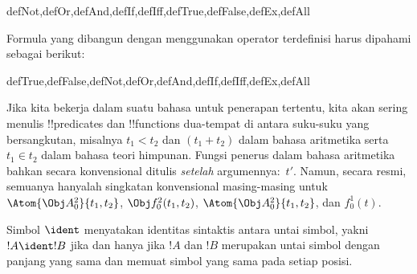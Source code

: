 \documentclass[../../../include/open-logic-section]{subfiles}
\begin{document}
\begin{tagblock}{defNot,defOr,defAnd,defIf,defIff,defTrue,defFalse,defEx,defAll}
\begin{defn}
Formula yang dibangun dengan menggunakan operator terdefinisi harus dipahami
sebagai berikut:

\begin{tagenumerate}{defTrue,defFalse,defNot,defOr,defAnd,defIf,defIff,defEx,defAll}









\end{tagenumerate}
\end{defn}
\end{tagblock}

Jika kita bekerja dalam suatu bahasa untuk penerapan tertentu, kita akan
sering menulis !!{predicate}s dan !!{function}s dua-tempat di antara
suku-suku yang bersangkutan, misalnya $t_1 < t_2$ dan $(t_1 + t_2)$ dalam
bahasa aritmetika serta $t_1 \in t_2$ dalam bahasa teori himpunan. Fungsi
penerus dalam bahasa aritmetika bahkan secara konvensional ditulis
\emph{setelah} argumennya:~$t'$. Namun, secara resmi, semuanya hanyalah
singkatan konvensional masing-masing untuk $\Atom{\Obj A^2_0}{t_1, t_2}$,
$\Obj f^2_0(t_1, t_2)$, $\Atom{\Obj A^2_0}{t_1, t_2}$, dan $f^1_0(t)$.

\begin{defn}
Simbol $\ident$ menyatakan identitas sintaktis antara untai simbol, yakni
$!A \ident !B$ jika dan hanya jika $!A$ dan $!B$ merupakan untai simbol
dengan panjang yang sama dan memuat simbol yang sama pada setiap posisi.
\end{defn}
\end{document}
